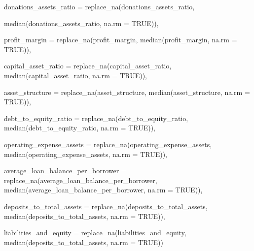 \documentclass[a4paper,nobind]{templates/ociamthesis}
\newenvironment{Shaded}{\begin{snugshade}}{\end{snugshade}}
\newcommand{\AttributeTok}[1]{\textcolor[rgb]{0.77,0.63,0.00}{#1}}
\newcommand{\ConstantTok}[1]{\textcolor[rgb]{0.00,0.00,0.00}{#1}}
\newcommand{\FunctionTok}[1]{\textcolor[rgb]{0.00,0.00,0.00}{#1}}
\newcommand{\NormalTok}[1]{#1}
\renewenvironment{Shaded}
{
  \vspace{10pt}%
  \begin{snugshade}%
}{%
  \end{snugshade}%
  \vspace{8pt}%
}
\begin{document}
\begin{Shaded}
\begin{Highlighting}[]
         \AttributeTok{donations\_assets\_ratio =} \FunctionTok{replace\_na}\NormalTok{(donations\_assets\_ratio, }
                                             
                                  \FunctionTok{median}\NormalTok{(donations\_assets\_ratio, }\AttributeTok{na.rm =} \ConstantTok{TRUE}\NormalTok{)),}
         
         \AttributeTok{profit\_margin =} \FunctionTok{replace\_na}\NormalTok{(profit\_margin, }\FunctionTok{median}\NormalTok{(profit\_margin, }\AttributeTok{na.rm =} \ConstantTok{TRUE}\NormalTok{)),}
         
         \AttributeTok{capital\_asset\_ratio =} \FunctionTok{replace\_na}\NormalTok{(capital\_asset\_ratio, }\FunctionTok{median}\NormalTok{(capital\_asset\_ratio, }\AttributeTok{na.rm =} \ConstantTok{TRUE}\NormalTok{)),}
         
         \AttributeTok{asset\_structure =} \FunctionTok{replace\_na}\NormalTok{(asset\_structure, }\FunctionTok{median}\NormalTok{(asset\_structure, }\AttributeTok{na.rm =} \ConstantTok{TRUE}\NormalTok{)),}
         
         \AttributeTok{debt\_to\_equity\_ratio =} \FunctionTok{replace\_na}\NormalTok{(debt\_to\_equity\_ratio, }\FunctionTok{median}\NormalTok{(debt\_to\_equity\_ratio, }\AttributeTok{na.rm =} \ConstantTok{TRUE}\NormalTok{)),}
         
         \AttributeTok{operating\_expense\_assets =} \FunctionTok{replace\_na}\NormalTok{(operating\_expense\_assets, }\FunctionTok{median}\NormalTok{(operating\_expense\_assets, }\AttributeTok{na.rm =} \ConstantTok{TRUE}\NormalTok{)),}
         
\AttributeTok{average\_loan\_balance\_per\_borrower =} \FunctionTok{replace\_na}\NormalTok{(average\_loan\_balance\_per\_borrower, }\FunctionTok{median}\NormalTok{(average\_loan\_balance\_per\_borrower, }\AttributeTok{na.rm =} \ConstantTok{TRUE}\NormalTok{)),}
         
         \AttributeTok{deposits\_to\_total\_assets =} \FunctionTok{replace\_na}\NormalTok{(deposits\_to\_total\_assets, }\FunctionTok{median}\NormalTok{(deposits\_to\_total\_assets, }\AttributeTok{na.rm =} \ConstantTok{TRUE}\NormalTok{)), }
         
\AttributeTok{liabilities\_and\_equity =} \FunctionTok{replace\_na}\NormalTok{(liabilities\_and\_equity, }\FunctionTok{median}\NormalTok{(deposits\_to\_total\_assets, }\AttributeTok{na.rm =} \ConstantTok{TRUE}\NormalTok{))}
         

\end{Highlighting}
\end{Shaded}
\end{document}
